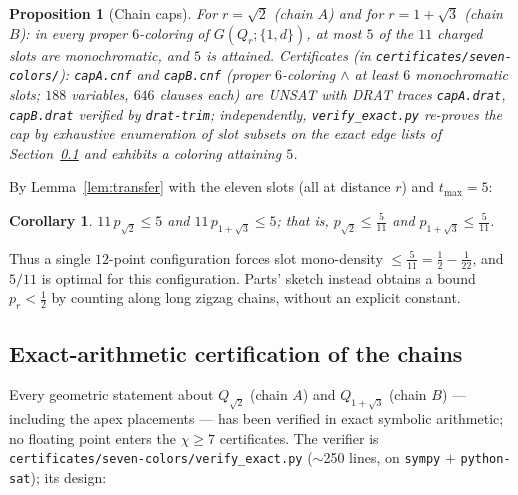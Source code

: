 \documentclass[11pt]{article}
\newtheorem{proposition}[theorem]{Proposition}
\newtheorem{corollary}[theorem]{Corollary}
\theoremstyle{definition}
\theoremstyle{remark}
\newcommand{\dd}{d}                          %
\begin{document}
\begin{proposition}[Chain caps]\label{prop:caps}
For $r=\sqrt2$ (chain $A$) and for $r=1+\sqrt3$ (chain $B$): in every
proper $6$-coloring of $G(Q_r;\{1,\dd\})$, at most $5$ of the $11$
charged slots are monochromatic, and $5$ is attained.  Certificates (in
\texttt{certificates/seven-colors/}): \texttt{capA.cnf} and
\texttt{capB.cnf} (proper $6$-coloring $\wedge$ at least $6$
monochromatic slots; $188$ variables, $646$ clauses each) are UNSAT with
DRAT traces \texttt{capA.drat}, \texttt{capB.drat} verified by
\texttt{drat-trim}; independently, \texttt{verify\_exact.py} re-proves
the cap by exhaustive enumeration of slot subsets on the \emph{exact}
edge lists of Section~\ref{sec:exact} and exhibits a coloring attaining
$5$.
\end{proposition}

By Lemma~\ref{lem:transfer} with the eleven slots (all at distance $r$)
and $t_{\max}=5$:

\begin{corollary}\label{cor:caps}
$11\,p_{\sqrt2}\le 5$ and $11\,p_{1+\sqrt3}\le 5$; that is,
$p_{\sqrt2}\le \tfrac5{11}$ and $p_{1+\sqrt3}\le\tfrac5{11}$.
\end{corollary}

Thus a single $12$-point configuration forces slot mono-density
$\le\tfrac5{11}=\tfrac12-\tfrac1{22}$, and $5/11$ is optimal for this
configuration.  Parts' sketch \cite{Parts19} instead obtains a bound
$p_r<\tfrac12$ by counting along long zigzag chains, without an explicit
constant.

\subsection{Exact-arithmetic certification of the chains}\label{sec:exact}

Every geometric statement about $Q_{\sqrt2}$ (chain $A$) and
$Q_{1+\sqrt3}$ (chain $B$) --- including the apex placements --- has been
verified in exact symbolic arithmetic; no floating point enters the
$\chi\ge7$ certificates.  The verifier is
\texttt{certificates/seven-colors/verify\_exact.py} ($\sim$250 lines, on
\texttt{sympy} $+$ \texttt{python-sat}); its design:
\end{document}
